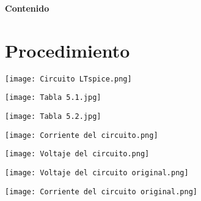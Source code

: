 \documentclass[a4paper, 11pt]{article}
\begin{document}
\textbf{}
\newpage

\begin{flushright}
\textbf{\Huge Contenido}
\end{flushright}

\renewcommand*\contentsname{}
{%
\tableofcontents
}



\newpage

\section{Procedimiento}

\texttt{[image: Circuito LTspice.png]}

\texttt{[image: Tabla 5.1.jpg]}

\texttt{[image: Tabla 5.2.jpg]}

\texttt{[image: Corriente del circuito.png]}

\texttt{[image: Voltaje del circuito.png]}

\texttt{[image: Voltaje del circuito original.png]}

\texttt{[image: Corriente del circuito original.png]}
\end{document}
